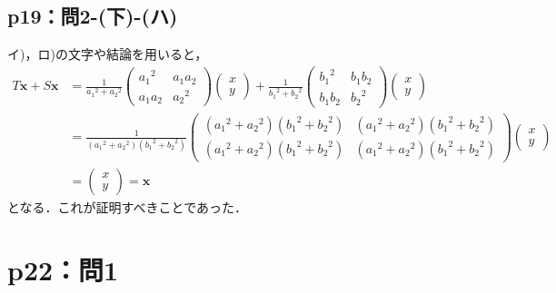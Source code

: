 \subsection*{p19：問2-(下)-(ハ)}
\begin{tproof}
  イ)，ロ)の文字や結論を用いると，
  \begin{align*}
    T \bm{x} + S \bm{x} & =
    \frac{1}{{a_1}^2+{a_2}^2}
    \begin{pmatrix}
      {a_1}^2 & a_1 a_2 \\
      a_1 a_2 & {a_2}^2
    \end{pmatrix}
    \begin{pmatrix}
      x \\
      y
    \end{pmatrix}
    +
    \frac{1}{{b_1}^2+{b_2}^2}
    \begin{pmatrix}
      {b_1}^2 & b_1 b_2 \\
      b_1 b_2 & {b_2}^2
    \end{pmatrix}
    \begin{pmatrix}
      x \\
      y
    \end{pmatrix}
    \\
                        & = \frac{1}{({a_1}^2+{a_2}^2)({b_1}^2+{b_2}^2)}
    \begin{pmatrix}
      ({a_1}^2+{a_2}^2)({b_1}^2+{b_2}^2) & ({a_1}^2+{a_2}^2)({b_1}^2+{b_2}^2) \\
      ({a_1}^2+{a_2}^2)({b_1}^2+{b_2}^2) & ({a_1}^2+{a_2}^2)({b_1}^2+{b_2}^2)
    \end{pmatrix}
    \begin{pmatrix}
      x \\
      y
    \end{pmatrix}
    \\
                        & =\begin{pmatrix}
                             x \\
                             y
                           \end{pmatrix}
    =\bm{x}
  \end{align*}
  となる．これが証明すべきことであった．
\end{tproof}



\section*{p22：問1}


